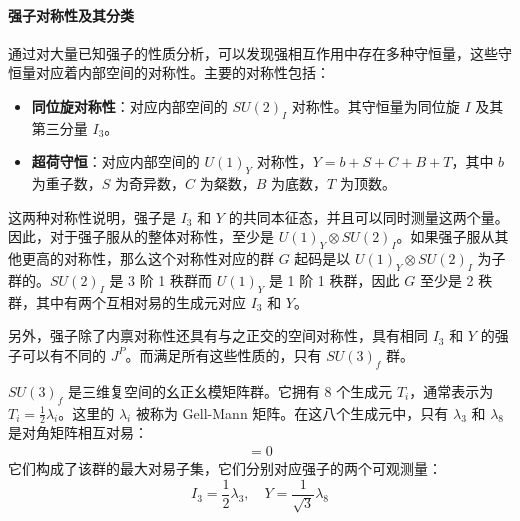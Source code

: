 \paragraph{强子对称性及其分类}

通过对大量已知强子的性质分析，可以发现强相互作用中存在多种守恒量，这些守恒量对应着内部空间的对称性。主要的对称性包括：
\begin{itemize}
    \item \textbf{同位旋对称性}：对应内部空间的 $SU(2)_I$ 对称性。其守恒量为同位旋 $I$ 及其第三分量 $I_3$。
    \item \textbf{超荷守恒}：对应内部空间的 $U(1)_Y$ 对称性，$Y = b + S + C + B + T$，其中 $b$ 为重子数，$S$ 为奇异数，$C$ 为粲数，$B$ 为底数，$T$ 为顶数。
\end{itemize}

这两种对称性说明，强子是 $I_3$ 和 $Y$ 的共同本征态，并且可以同时测量这两个量。因此，对于强子服从的整体对称性，至少是 $U(1)_Y \otimes SU(2)_I$。如果强子服从其他更高的对称性，那么这个对称性对应的群 $G$ 起码是以 $U(1)_Y \otimes SU(2)_I$ 为子群的。$SU(2)_I$ 是 3 阶 1 秩群而 $U(1)_Y$ 是 1 阶 1 秩群，因此 $G$ 至少是 2 秩群，其中有两个互相对易的生成元对应 $I_3$ 和 $Y$。

另外，强子除了内禀对称性还具有与之正交的空间对称性，具有相同 $I_3$ 和 $Y$ 的强子可以有不同的 $J^{P}$。而满足所有这些性质的，只有 $SU(3)_f$ 群。


$SU(3)_f$ 是三维复空间的幺正幺模矩阵群。它拥有 8 个生成元 $T_i$，通常表示为 $T_i = \frac{1}{2}\lambda_i$。这里的 $\lambda_i$ 被称为 Gell-Mann 矩阵。在这八个生成元中，只有 $\lambda_3$ 和 $\lambda_8$ 是对角矩阵相互对易：
\begin{align}
    [\lambda_3, \lambda_8] = 0
\end{align}
它们构成了该群的最大对易子集，它们分别对应强子的两个可观测量：
\begin{equation}
    I_3 = \frac{1}{2}\lambda_3, \quad Y = \frac{1}{\sqrt{3}}\lambda_8
\end{equation}

